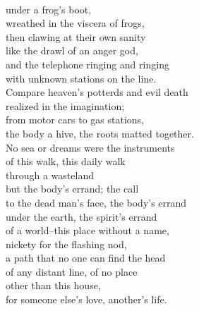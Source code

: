 \documentclass[smalldemyvopaper,11pt,twoside,onecolumn,openright,extrafontsizes]{memoir}
\begin{document}
\\under a frog's boot,
\\wreathed in the viscera of frogs,
\\then clawing at their own sanity
\\like the drawl of an anger god,
\\and the telephone ringing and ringing
\\with unknown stations on the line.
\\Compare heaven's potterds and evil death
\\realized in the imagination;
\\from motor cars to gas stations,
\\the body a hive, the roots matted together.
\\No sea or dreams were the instruments
\\of this walk, this daily walk
\\through a wasteland
\\but the body's errand; the call
\\to the dead man's face, the body's errand
\\under the earth, the spirit's errand
\\of a world--this place without a name,
\\nickety for the flashing nod,
\\a path that no one can find the head
\\of any distant line, of no place
\\other than this house,
\\for someone else's love, another's life.
\end{document}
